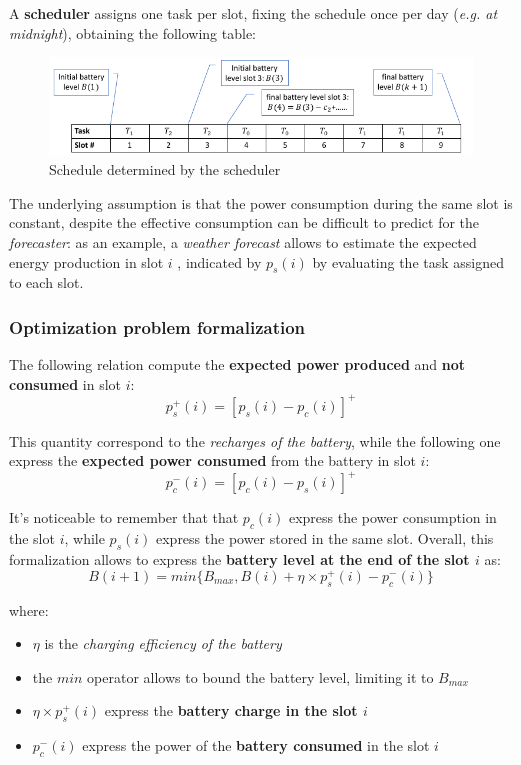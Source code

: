 \documentclass[10pt,a4paper]{report}
\theoremstyle{definition}
\begin{document}
A \textbf{scheduler} assigns one task per slot, fixing the schedule once per day (\textit{e.g. at midnight}), obtaining the following table:
\begin{figure}[h]
	\centering\includegraphics[scale=0.50]{images/Pasted image 20230514104854.png}	\caption{Schedule determined by the scheduler}
\end{figure}


The underlying assumption is that the power consumption during the same slot is constant, despite the effective consumption can be difficult to predict for the \textit{forecaster}: as an example, a \textit{weather forecast} allows to estimate the expected energy production in slot $i$ , indicated by $p_{s}(i)$ by evaluating the task assigned to each slot.
\subsubsection{Optimization problem formalization}\label{sec:optimization-problem-formalization}
The following relation compute the \textbf{expected power produced} and \textbf{not consumed} in slot $i$:
\begin{equation}
	p_{s}^{+}(i) = [p_{s}(i) - p_{c}(i)]^{+}
\end{equation}

This quantity correspond to the \textit{recharges of the battery}, while the following one express the \textbf{expected power consumed} from the battery in slot $i$:
\begin{equation}
	p_{c}^{-}(i) = [p_{c}(i) - p_{s}(i)]^{+}
\end{equation}

It's noticeable to remember that that $p_{c}(i)$ express the power consumption in the slot $i$, while $p_{s}(i)$ express the power stored in the same slot.
Overall, this formalization allows to express the \textbf{battery level at the end of the slot $i$} as:
\begin{equation}
B(i+1) = min\{B_{max}, B(i)+\eta \times p_{s}^{+}(i) - p_{c}^{-}(i)\}
\end{equation}

where:
\begin{itemize}
	\item 
	$\eta$ is the \textit{charging efficiency of the battery}
	\item 
	the $min$ operator allows to bound the battery level, limiting it to $B_{max}$
	\item 
	$\eta \times p_{s}^{+}(i)$ express the \textbf{battery charge in the slot $i$}
	\item 
	$p_{c}^{-}(i)$ express the power of the \textbf{battery consumed} in the slot $i$
\end{itemize}
\end{document}
